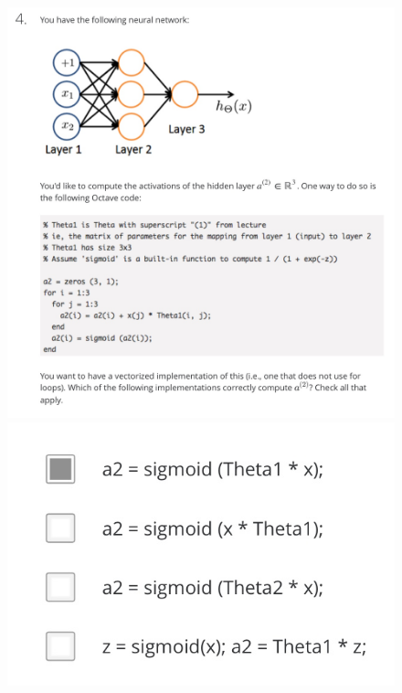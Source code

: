 \documentclass[12pt, A4,onecolumn]{article} %
\begin{document}
\begin{figure}[H]
  \includegraphics[width=\linewidth]{./ImagenesW4/testNN4_1}
\endminipage\hfill
{}
  \includegraphics[width=\linewidth]{./ImagenesW4/testNN4_2}
\endminipage\hfill
\end{figure}
\end{document}
